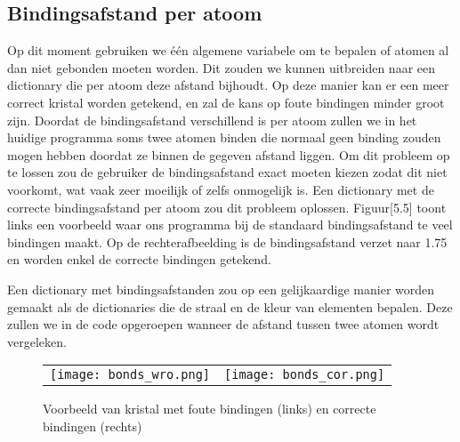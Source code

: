 \subsection{Bindingsafstand per atoom}
Op dit moment gebruiken we één algemene variabele om te bepalen of atomen al dan niet gebonden moeten worden. Dit zouden we kunnen uitbreiden naar een dictionary die per atoom deze afstand bijhoudt. Op deze manier kan er een meer correct kristal worden getekend, en zal de kans op foute bindingen minder groot zijn. Doordat de bindingsafstand verschillend is per atoom zullen we in het huidige programma soms twee atomen binden die normaal geen binding zouden mogen hebben doordat ze binnen de gegeven afstand liggen. Om dit probleem op te lossen zou de gebruiker de bindingsafstand exact moeten kiezen zodat dit niet voorkomt, wat vaak zeer moeilijk of zelfs onmogelijk is. Een dictionary met de correcte bindingsafstand per atoom zou dit probleem oplossen. Figuur[5.5] toont links een voorbeeld waar ons programma bij de standaard bindingsafstand te veel bindingen maakt. Op de rechterafbeelding is de bindingsafstand verzet naar 1.75 en worden enkel de correcte bindingen getekend.
\par
Een dictionary met bindingsafstanden zou op een gelijkaardige manier worden gemaakt als de dictionaries die de straal en de kleur van elementen bepalen. Deze zullen we in de code opgeroepen wanneer de afstand tussen twee atomen wordt vergeleken.
\begin{figure}[H]
\begin{center}
\begin{tabular}{l|l}

\texttt{[image: bonds\_wro.png]}
&
\texttt{[image: bonds\_cor.png]}

\end{tabular}
\end{center}
\caption{Voorbeeld van kristal met foute bindingen (links) en correcte bindingen (rechts)}
\end{figure}
    

